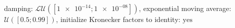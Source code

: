 damping: $\mathcal{LU}([\num[scientific-notation=true]{1e-14}; \num[scientific-notation=true]{1e-08}])$, exponential moving average: $\mathcal{U}([\num[scientific-notation=true]{0.5}; \num[scientific-notation=true]{0.99}])$, initialize Kronecker factors to identity: $\text{yes}$
